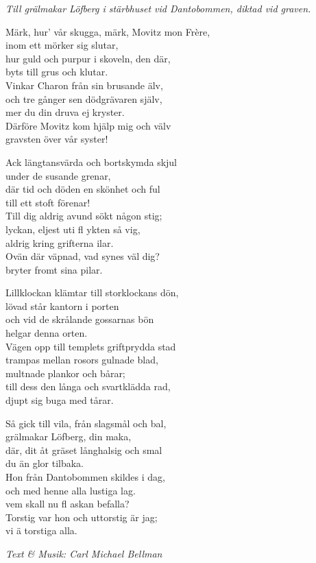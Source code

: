 {\footnotesize\textit{Till grälmakar Löfberg i stärbhuset vid Dantobommen, diktad vid graven.}}\par
\vspace{10pt}
Märk, hur' vår skugga, märk, Movitz mon Frère,\\
inom ett mörker sig slutar,\\
hur guld och purpur i skoveln, den där,\\
byts till grus och klutar.\\
Vinkar Charon från sin brusande älv,\\
och tre gånger sen dödgrävaren själv,\\
mer du din druva ej kryster.\\
Därföre Movitz kom hjälp mig och välv\\
gravsten över vår syster!\par
\vspace{10pt}
Ack längtansvärda och bortskymda skjul\\
under de susande grenar,\\
där tid och döden en skönhet och ful\\
till ett stoft förenar!\\
Till dig aldrig avund sökt någon stig;\\
lyckan, eljest uti fl ykten så vig,\\
aldrig kring grifterna ilar.\\
Ovän där väpnad, vad synes väl dig?\\
bryter fromt sina pilar.\par
\newpage
Lillklockan klämtar till storklockans dön,\\
lövad står kantorn i porten\\
och vid de skrålande gossarnas bön\\
helgar denna orten.\\
Vägen opp till templets griftprydda stad\\
trampas mellan rosors gulnade blad,\\
multnade plankor och bårar;\\
till dess den långa och svartklädda rad,\\
djupt sig buga med tårar.\par
\vspace{10pt}
Så gick till vila, från slagsmål och bal,\\
grälmakar Löfberg, din maka,\\
där, dit åt gräset långhalsig och smal\\
du än glor tilbaka.\\
Hon från Dantobommen skildes i dag,\\
och med henne alla lustiga lag.\\
vem skall nu fl askan befalla?\\
Torstig var hon och uttorstig är jag;\\
vi ä torstiga alla.\par
\vspace{10pt}
{\footnotesize\textit{Text & Musik: Carl Michael Bellman}}
